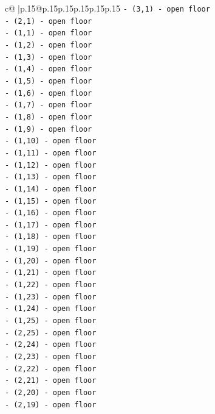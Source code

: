 \documentclass{article}
\begin{document}
{\begin{supertabular}{c@{$\;$}|p{.15\linewidth}@{}p{.15\linewidth}p{.15\linewidth}p{.15\linewidth}p{.15\linewidth}p{.15\linewidth}}
{{{\texttt{{-} (3,1) {-} open floor} \\
\texttt{{-} (2,1) {-} open floor} \\
\texttt{{-} (1,1) {-} open floor} \\
\texttt{{-} (1,2) {-} open floor} \\
\texttt{{-} (1,3) {-} open floor} \\
\texttt{{-} (1,4) {-} open floor} \\
\texttt{{-} (1,5) {-} open floor} \\
\texttt{{-} (1,6) {-} open floor} \\
\texttt{{-} (1,7) {-} open floor} \\
\texttt{{-} (1,8) {-} open floor} \\
\texttt{{-} (1,9) {-} open floor} \\
\texttt{{-} (1,10) {-} open floor} \\
\texttt{{-} (1,11) {-} open floor} \\
\texttt{{-} (1,12) {-} open floor} \\
\texttt{{-} (1,13) {-} open floor} \\
\texttt{{-} (1,14) {-} open floor} \\
\texttt{{-} (1,15) {-} open floor} \\
\texttt{{-} (1,16) {-} open floor} \\
\texttt{{-} (1,17) {-} open floor} \\
\texttt{{-} (1,18) {-} open floor} \\
\texttt{{-} (1,19) {-} open floor} \\
\texttt{{-} (1,20) {-} open floor} \\
\texttt{{-} (1,21) {-} open floor} \\
\texttt{{-} (1,22) {-} open floor} \\
\texttt{{-} (1,23) {-} open floor} \\
\texttt{{-} (1,24) {-} open floor} \\
\texttt{{-} (1,25) {-} open floor} \\
\texttt{{-} (2,25) {-} open floor} \\
\texttt{{-} (2,24) {-} open floor} \\
\texttt{{-} (2,23) {-} open floor} \\
\texttt{{-} (2,22) {-} open floor} \\
\texttt{{-} (2,21) {-} open floor} \\
\texttt{{-} (2,20) {-} open floor} \\
\texttt{{-} (2,19) {-} open floor} \\
}}}
\end{supertabular}}
\end{document}
